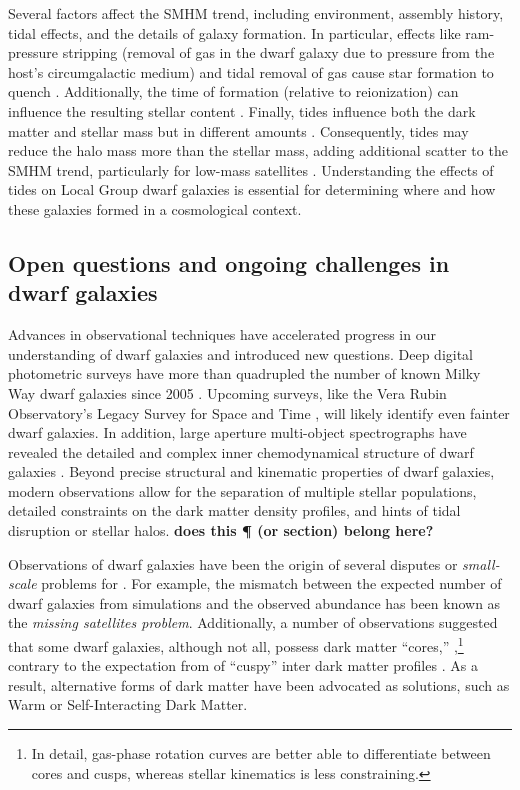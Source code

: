 Several factors affect the SMHM trend, including environment, assembly
history, tidal effects, and the details of galaxy formation. In
particular, effects like ram-pressure stripping (removal of gas in the
dwarf galaxy due to pressure from the host's circumgalactic medium) and
tidal removal of gas cause star formation to quench
\citep[e.g.,][]{christensen+2024}. Additionally, the time of formation
(relative to reionization) can influence the resulting stellar content
\citep{kim+2024}. Finally, tides influence both the dark matter and
stellar mass but in different amounts \citep[e.g.,][]{PNM2008}.
Consequently, tides may reduce the halo mass more than the stellar mass,
adding additional scatter to the SMHM trend, particularly for low-mass
satellites \citep[e.g.,][]{fattahi+2018}. Understanding the effects of
tides on Local Group dwarf galaxies is essential for determining where
and how these galaxies formed in a cosmological context.

\subsection{Open questions and ongoing challenges in dwarf
galaxies}\label{open-questions-and-ongoing-challenges-in-dwarf-galaxies}

Advances in observational techniques have accelerated progress in our
understanding of dwarf galaxies and introduced new questions. Deep
digital photometric surveys have more than quadrupled the number of
known Milky Way dwarf galaxies since 2005 \citep{simon2019}. Upcoming
surveys, like the Vera Rubin Observatory's Legacy Survey for Space and
Time \citep[LSST,][]{ivezic+2019}, will likely identify even fainter
dwarf galaxies. In addition, large aperture multi-object spectrographs
have revealed the detailed and complex inner chemodynamical structure of
dwarf galaxies \citep[e.g.,][]{battaglia+2006, fabrizio+2016}. Beyond
precise structural and kinematic properties of dwarf galaxies, modern
observations allow for the separation of multiple stellar populations,
detailed constraints on the dark matter density profiles, and hints of
tidal disruption or stellar halos. \textbf{does this ¶ (or section)
belong here?}

Observations of dwarf galaxies have been the origin of several disputes
or \emph{small-scale} problems for \LCDM{} \citep[see reviews
by][]{bullock+boylan-kolchin2017, sales+2022}. For example, the mismatch
between the expected number of dwarf galaxies from simulations and the
observed abundance has been known as the \emph{missing satellites
problem}. Additionally, a number of observations suggested that some
dwarf galaxies, although not all, possess dark matter ``cores,''
\citep[e.g.,][]{moore1994, adams+2014, oh+2015, walker+penarrubia2011, read+walker+steger2019},\footnote{In
  detail, gas-phase rotation curves are better able to differentiate
  between cores and cusps, whereas stellar kinematics is less
  constraining.} contrary to the expectation from \LCDM{} of ``cuspy''
inter dark matter profiles \citep{NFW1996, NFW1997}. As a result,
alternative forms of dark matter have been advocated as solutions, such
as Warm or Self-Interacting Dark Matter.

